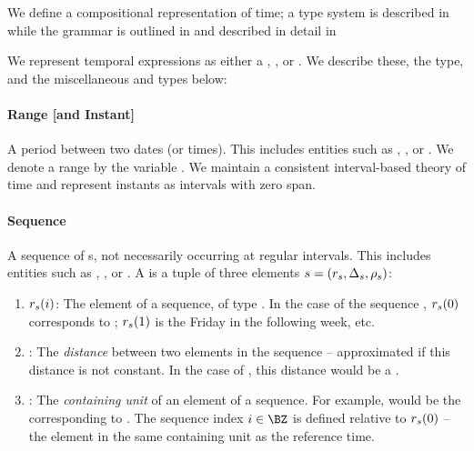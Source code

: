 We define a compositional representation of time; a type system 
	is described in  while the grammar is outlined in
	 and described in detail in 

We represent temporal expressions as either a , ,
	or .
We describe these, the  type, and the miscellaneous
	 and  types below:
\paragraph{Range [and Instant]}
A period between two dates (or times).
This includes entities such as , , or
	.
We denote a range by the variable \range.
We maintain a consistent interval-based theory of time
	\cite{key:1981allen-temporal} and represent instants as intervals with
	zero span.

\paragraph{Sequence}
A sequence of s, not necessarily occurring at regular intervals.
This includes entities such as , , or
	.
A  is a tuple of three elements
	$s=(r_s,\Delta_s,\rho_s)$:
\begin{enumerate}
	\setlength{\itemsep}{-5pt} 
	\item $r_s(i)$: 
		The  element of a sequence, of type .
		In the case of the sequence , $r_s(0)$ corresponds to
			; 
			$r_s(1)$ is the Friday in the following week, etc.
	\item \seqjump:
		The \textit{distance} between two elements in the sequence -- approximated
			if this distance is not constant.
		In the case of , this distance would be a .
	\item \seqcanon:
		The \textit{containing unit} of an element of a sequence.
		For example,  would be the 
			corresponding to .
		The sequence index $i \in \BZ$ is defined relative to $r_s(0)$ --
			the element in the same containing unit as the reference time.
\end{enumerate}

